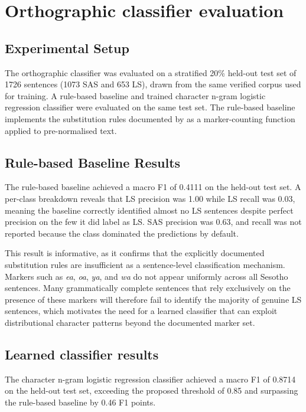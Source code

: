 \documentclass[12pt]{ThesisRU}
\begin{document}
\section{Orthographic classifier evaluation}

\subsection{Experimental Setup }

The orthographic classifier was evaluated on a stratified 20\% held-out test set of 1726 sentences (1073 SAS and 653 LS), drawn from the same verified corpus used for training. A rule-based baseline and trained character n-gram logistic regression classifier were evaluated on the same test set. The rule-based baseline implements the substitution rules documented by \citet{makutoane2022people} as a marker-counting function applied to pre-normalised text.

\subsection{Rule-based Baseline Results}

The rule-based baseline achieved a macro F1 of 0.4111 on the held-out test set. A per-class breakdown reveals that LS precision was 1.00 while LS recall was 0.03, meaning the baseline correctly identified almost no LS sentences despite perfect precision on the few it did label as LS. SAS precision was 0.63, and recall was not reported because the class dominated the predictions by default.

This result is informative, as it confirms that the explicitly documented substitution rules are insufficient as a sentence-level classification mechanism. Markers such as \textit{ea}, \textit{oa}, \textit{ya}, and \textit{wa} do not appear uniformly across all Sesotho sentences. Many grammatically complete sentences that rely exclusively on the presence of these markers will therefore fail to identify the majority of genuine LS sentences, which motivates the need for a learned classifier that can exploit distributional character patterns beyond the documented marker set.

\subsection{Learned classifier results}
The character n-gram logistic regression classifier achieved a macro F1 of 0.8714 on the held-out test set, exceeding the proposed threshold of 0.85 and surpassing the rule-based baseline by 0.46 F1 points.
\end{document}
